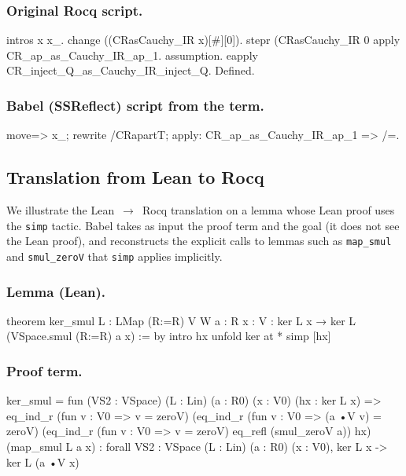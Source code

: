 \documentclass{article}
\theoremstyle{plain}
\theoremstyle{definition}
\theoremstyle{remark}
\begin{document}
	\subsubsection*{Original Rocq script.}
	\begin{rocq}
		intros x x_.
		change ((CRasCauchy_IR x)[#][0]).
		stepr (CRasCauchy_IR 0%
		apply CR_ap_as_Cauchy_IR_ap_1.
		assumption.
		eapply CR_inject_Q_as_Cauchy_IR_inject_Q.
		Defined.
	\end{rocq}
	
	\subsubsection*{Babel (SSReflect) script from the term.}
	\begin{rocq}
		move=> x_; rewrite /CRapartT; apply: CR_ap_as_Cauchy_IR_ap_1 => /=.
	\end{rocq}
	
	\subsection{Translation from Lean to Rocq}
	\label{app:leanrocq}
	
	We illustrate the Lean~$\to$~Rocq translation on a lemma whose Lean proof uses the \texttt{simp} tactic. Babel takes as input the proof term and the goal (it does not see the Lean proof), and reconstructs the explicit calls to lemmas such as \texttt{map\_smul} and \texttt{smul\_zeroV} 
	that \texttt{simp} applies implicitly.
	
	\subsubsection*{Lemma (Lean).}
        
	\begin{rocq}
		theorem ker_smul {L : LMap (R:=R) V W} {a : R} {x : V} :
		ker L x → ker L (VSpace.smul (R:=R) a x) :=
		by
		intro hx
		unfold ker at *
		simp [hx]
	\end{rocq}
	
	\subsubsection*{Proof term.}
	\begin{rocq}
		ker_smul =
		fun (VS2 : VSpace) (L : Lin) (a : R0) (x : V0) (hx : ker L x) =>
		eq_ind_r (fun v : V0 => v = zeroV)
		(eq_ind_r (fun v : V0 => (a •V v) = zeroV)
		(eq_ind_r (fun v : V0 => v = zeroV) eq_refl (smul_zeroV a)) hx)
		(map_smul L a x)
		: forall {VS2 : VSpace} (L : Lin) (a : R0) (x : V0),
		ker L x -> ker L (a •V x)
	\end{rocq}
	
\end{document}

